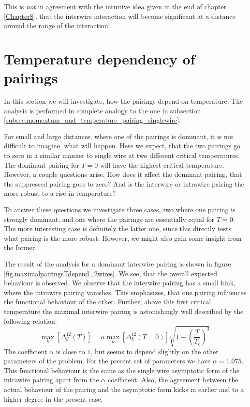 This is \textit{not} in agreement with the intuitive idea given in the end of chapter \ref{Chapter8}, that the interwire interaction will become significant at a distance around the range of the interaction!

\section{Temperature dependency of pairings}
In this section we will investigate, how the pairings depend on temperature. The analysis is performed in complete analogy to the one in subsection \ref{subsec.momentum_and_temperature_pairing_singlewire}. 

For small and large distances, where one of the pairings is dominant, it is not difficult to imagine, what will happen. Here we expect, that the two pairings go to zero in a similar manner to single wire at two different critical temperatures. The dominant pairing for $T = 0$ will have the highest critical temperature. However, a couple questions arise. How does it affect the dominant pairing, that the suppressed pairing goes to zero? And is the interwire or intrawire pairing the more robust to a rise in temperature?

To answer these questions we investigate three cases, two where one pairing is strongly dominant, and one where the pairings are essentially equal for $T = 0$. The more interesting case is definitely the latter one, since this directly tests what pairing is the more robust. However, we might also gain some insight from the former. 

The result of the analysis for a dominant interwire pairing is shown in figure \ref{fig.maximalpairingsTdepend_2wires}. We see, that the overall expected behaviour is observed. We observe that the interwire pairing has a small kink, where the intrawire pairing vanishes. This emphasizes, that one pairing influences the functional behaviour of the other. Further, above this first critical temperature the maximal interwire pairing is astonishingly well described by the following relation:
\begin{equation}
\max_k[\Delta^{12}_k(T)] = \alpha \max_k[\Delta^{12}_k(T = 0)] \sqrt{1 - \left(\frac{T}{T_c}\right)^3}. 
\end{equation}
The coefficient $\alpha$ is close to $1$, but seems to depend slightly on the other parameters of the problem. For the present set of parameters we have $\alpha = 1.075$. This functional behaviour is the same as the single wire asymptotic form of the intrawire pairing apart from the $\alpha$ coefficient. Also, the agreement between the actual behaviour of the pairing and the asymptotic form kicks in earlier and to a higher degree in the present case. 


